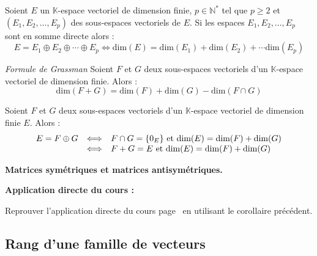 \documentclass[french,11pt,twoside]{VcCours}
\newenvironment{ApplicationDirecte}{\textbf{Application directe du cours :}

}{}
\begin{document}
\begin{Corollaire}{} Soient $E$ un $\mathbb{K}$-espace vectoriel de dimension finie, $p \in \mathbb{N}^*$ tel que $p \geq 2$ et $(E_1, E_2, \ldots, E_p)$ des sous-espaces vectoriels de $E$. Si les espaces $E_1, E_2, \ldots, E_p$ sont en somme directe alors :
$$ E = E_1 \oplus E_2 \oplus \cdots \oplus E_p \Longleftrightarrow  \textrm{dim}(E) = \textrm{dim}(E_1) + \textrm{dim}(E_2) + \cdots \textrm{dim}(E_p)$$
\end{Corollaire}


\begin{Proposition}{\emph{Formule de Grassman}} Soient $F$ et $G$ deux sous-espaces vectoriels d'un $\mathbb{K}$-espace vectoriel de dimension finie. Alors :
$$ \textrm{dim}(F+G) = \textrm{dim}(F) + \textrm{dim}(G) - \textrm{dim}( F \cap G)$$
\end{Proposition}

\begin{Corollaire}{} Soient $F$ et $G$ deux sous-espaces vectoriels d'un $\mathbb{K}$-espace vectoriel de dimension finie $E$. Alors :
$$ \begin{array}{ccl}
E = F \oplus G & \Longleftrightarrow & { F \cap G = \lbrace 0_E \rbrace \hbox{ et } \textrm{dim}(E) = \textrm{dim}(F) + \textrm{dim}(G)} \\
& \Longleftrightarrow & { F + G = E  \hbox{ et } \textrm{dim}(E) = \textrm{dim}(F) + \textrm{dim}(G)} \\
\end{array}$$
\end{Corollaire}

\begin{Exemple} \textbf{Matrices symétriques et matrices antisymétriques.}
\end{Exemple}


\newpage
\vspace*{14cm}
\begin{ApplicationDirecte} Reprouver l'application directe du cours 
	page~\pageref{Exo} en utilisant le corollaire précédent.
\end{ApplicationDirecte}

\subsection{Rang d'une famille de vecteurs}
\end{document}
